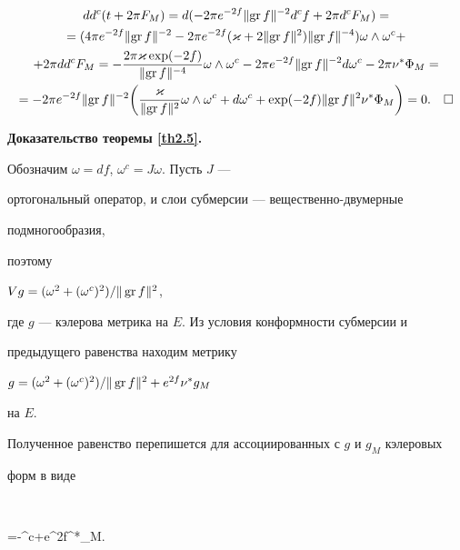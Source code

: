 \begin{gather*}


dd^c(t+2\pi F_M)=d( -2\pi e^{-2f}\Norma{\GR f}^{-2}d^cf+2\pi d^cF_M) =\\


=( 4\pi e^{-2f}\Norma{\GR f}^{-2}-2\pi e^{-2f}(\vkap +2\Norma{\GR f}^2)


\Norma{\GR f}^{-4}) \omega \land \omega^c+\\


+2\pi dd^cF_M=-\frac{2\pi \vkap \exp (-2f)}{\Norma{\GR f}^{-4}}


\omega \land \omega^c-2\pi e^{-2f}\Norma{\GR f}^{-2}d\omega^c-


2\pi \nu^*\Phi_M=\\


=-2\pi e^{-2f}\Norma{\GR f}^{-2}\bigg( \frac{\vkap }{\Norma{\GR f}^2}\omega


\land


\omega^c+d\omega^c+\exp (-2f)\Norma{\GR f}^2\nu^*\Phi_M\bigg) =0.


\quad\square


\end{gather*}





{\bf Доказательство теоремы \ref{th2.5}.}


Обозначим $\omega =df$, $\omega^c=J\omega$. Пусть $J$ ---


ортогональный оператор, и слои субмерсии --- вещественно-двумерные


подмногообразия,


поэтому


$Vg=( \omega^2+(\omega^c)^2) /\Vert \operatorname{gr} f\Vert^2$,


где $g$ --- кэлерова метрика на $E$. Из условия конформности субмерсии и


предыдущего равенства находим метрику


$g=( \omega^2+(\omega^c)^2) /\Vert \operatorname{gr} f\Vert^2+e^{2f}\nu^*g_M$


на $E$.


Полученное равенство перепишется для ассоциированных с $g$ и $g_M$ кэлеровых


форм в виде


$$




\Phi =-\omega \land \omega^c+e^{2f}\nu^*\Phi_M.


\label{4.6}


